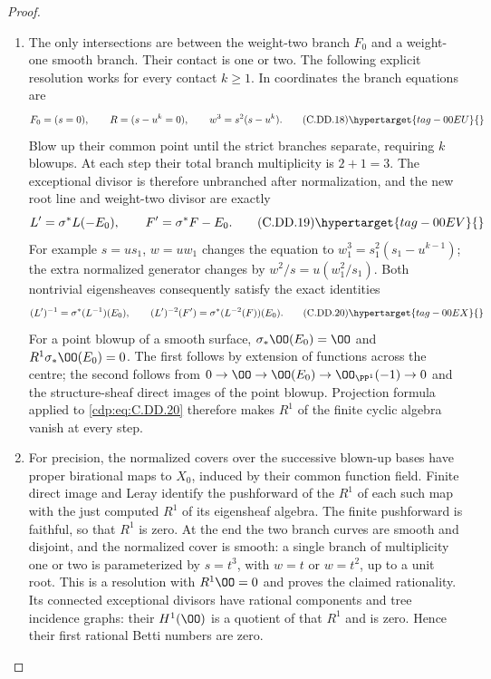 \begin{proof}
\begin{enumerate}[label={$\langle1\rangle$\arabic*.},leftmargin=*]
\item The only intersections are between the weight-two
branch $F_0$ and a weight-one smooth branch. Their
contact is one or two. The following explicit
resolution works for every contact $k\ge1$.
In coordinates the branch equations are
\[
                F_0=(s=0),\qquad R=(s-u^k=0),
                \qquad w^3=s^2(s-u^k).
\tag{C.DD.18}\hypertarget{tag-00EU}{}\label{cdp:eq:C.DD.18}
\]
Blow up their common point until the strict
branches separate, requiring $k$ blowups. At
each step their total branch multiplicity is
$2+1=3$. The exceptional divisor is therefore
unbranched after normalization, and the new
root line and weight-two divisor are exactly
\[
 L'=\sigma^*L(-E_0),\qquad
 F'=\sigma^*F-E_0.
\tag{C.DD.19}\hypertarget{tag-00EV}{}\label{cdp:eq:C.DD.19}
\]
For example $s=u s_1$, $w=u w_1$ changes the
equation to
$w_1^3=s_1^2(s_1-u^{k-1})$; the extra normalized
generator changes by
$w^2/s=u(w_1^2/s_1)$.
Both nontrivial eigensheaves consequently satisfy
the exact identities
\[
 (L')^{-1}=\sigma^*(L^{-1})(E_0),\qquad
 (L')^{-2}(F')=\sigma^*(L^{-2}(F))(E_0).
\tag{C.DD.20}\hypertarget{tag-00EX}{}\label{cdp:eq:C.DD.20}
\]
For a point blowup of a smooth surface,
$\sigma_*\OO(E_0)=\OO$ and
$R^1\sigma_*\OO(E_0)=0$.
The first follows by extension of functions across
the centre; the second follows from
$0\to\OO\to\OO(E_0)\to\OO_{\PP^1}(-1)\to0$
and the structure-sheaf direct images of the
point blowup. Projection formula applied to
\eqref{cdp:eq:C.DD.20} therefore makes $R^1$ of the finite
cyclic algebra vanish at every step.

\item For precision, the normalized covers over the
successive blown-up bases have proper birational
maps to $X_0$, induced by their common function
field. Finite direct image and Leray identify the
pushforward of the $R^1$ of each such map with
the just computed $R^1$ of its eigensheaf algebra.
The finite pushforward is faithful, so that $R^1$
is zero. At the end the two branch curves are
smooth and disjoint, and the normalized cover
is smooth: a single branch of multiplicity one
or two is parameterized by $s=t^3$, with $w=t$
or $w=t^2$, up to a unit root. This is a resolution
with $R^1\OO=0$ and proves the claimed rationality.
Its connected exceptional divisors have rational
components and tree incidence graphs: their
$H^1(\OO)$ is a quotient of that $R^1$ and is zero.
Hence their first rational Betti numbers are zero.


\end{enumerate}
\end{proof}
